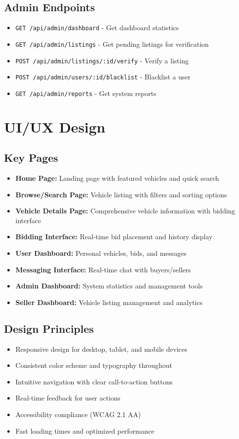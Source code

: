 \subsection{Admin Endpoints}
\begin{itemize}
    \item \texttt{GET /api/admin/dashboard} - Get dashboard statistics
    \item \texttt{GET /api/admin/listings} - Get pending listings for verification
    \item \texttt{POST /api/admin/listings/:id/verify} - Verify a listing
    \item \texttt{POST /api/admin/users/:id/blacklist} - Blacklist a user
    \item \texttt{GET /api/admin/reports} - Get system reports
\end{itemize}

\section{UI/UX Design}

\subsection{Key Pages}
\begin{itemize}
    \item \textbf{Home Page:} Landing page with featured vehicles and quick search
    \item \textbf{Browse/Search Page:} Vehicle listing with filters and sorting options
    \item \textbf{Vehicle Details Page:} Comprehensive vehicle information with bidding interface
    \item \textbf{Bidding Interface:} Real-time bid placement and history display
    \item \textbf{User Dashboard:} Personal vehicles, bids, and messages
    \item \textbf{Messaging Interface:} Real-time chat with buyers/sellers
    \item \textbf{Admin Dashboard:} System statistics and management tools
    \item \textbf{Seller Dashboard:} Vehicle listing management and analytics
\end{itemize}

\subsection{Design Principles}
\begin{itemize}
    \item Responsive design for desktop, tablet, and mobile devices
    \item Consistent color scheme and typography throughout
    \item Intuitive navigation with clear call-to-action buttons
    \item Real-time feedback for user actions
    \item Accessibility compliance (WCAG 2.1 AA)
    \item Fast loading times and optimized performance
\end{itemize}

